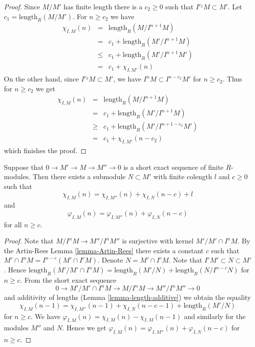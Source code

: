 \begin{proof}
Since $M/M'$ has finite length there is a $c_2 \geq 0$ such that
$I^{c_2}M \subset M'$. Let $c_1 = \text{length}_R(M/M')$.
For $n \geq c_2$ we have
\begin{eqnarray*}
\chi_{I, M}(n)
& = &
\text{length}_R(M/I^{n + 1}M) \\
& = &
c_1 + \text{length}_R(M'/I^{n + 1}M) \\
& \leq &
c_1 + \text{length}_R(M'/I^{n + 1}M') \\
& = &
c_1 + \chi_{I, M'}(n)
\end{eqnarray*}
On the other hand, since $I^{c_2}M \subset M'$,
we have $I^nM \subset I^{n - c_2}M'$ for $n \geq c_2$.
Thus for $n \geq c_2$ we get
\begin{eqnarray*}
\chi_{I, M}(n)
& = &
\text{length}_R(M/I^{n + 1}M) \\
& = &
c_1 + \text{length}_R(M'/I^{n + 1}M) \\
& \geq &
c_1 + \text{length}_R(M'/I^{n + 1 - c_2}M') \\
& = &
c_1 + \chi_{I, M'}(n - c_2)
\end{eqnarray*}
which finishes the proof.
\end{proof}

\begin{lemma}
\label{lemma-hilbert-ses}
Suppose that $0 \to M' \to M \to M'' \to 0$
is a short exact sequence of finite $R$-modules.
Then there exists a submodule $N \subset M'$ with
finite colength $l$ and $c \geq 0$ such that
$$
\chi_{I, M}(n) = \chi_{I, M''}(n) + \chi_{I, N}(n - c) + l
$$
and
$$
\varphi_{I, M}(n) = \varphi_{I, M''}(n) + \varphi_{I, N}(n - c)
$$
for all $n \geq c$.
\end{lemma}

\begin{proof}
Note that $M/I^nM \to M''/I^nM''$ is surjective
with kernel $M' / M' \cap I^nM$. By the Artin-Rees
Lemma \ref{lemma-Artin-Rees} there exists a
constant $c$ such that $M' \cap I^nM =
I^{n - c}(M' \cap I^cM)$. Denote $N = M' \cap I^cM$.
Note that $I^c M' \subset N \subset M'$.
Hence $\text{length}_R(M' / M' \cap I^nM)
= \text{length}_R(M'/N) + \text{length}_R(N/I^{n - c}N)$ for $n \geq c$.
From the short exact sequence
$$
0 \to M' / M' \cap I^nM \to M/I^nM \to M''/I^nM'' \to 0
$$
and additivity of lengths (Lemma \ref{lemma-length-additive})
we obtain the equality
$$
\chi_{I, M}(n - 1)
=
\chi_{I, M''}(n - 1)
+
\chi_{I, N}(n - c - 1)
+
\text{length}_R(M'/N)
$$
for $n \geq c$. We have
$\varphi_{I, M}(n) = \chi_{I, M}(n) - \chi_{I, M}(n - 1)$
and similarly for the modules $M''$ and $N$. Hence
we get $\varphi_{I, M}(n) = \varphi_{I, M''}(n) + \varphi_{I, N}(n-c)$ for
$n \geq c$.
\end{proof}


